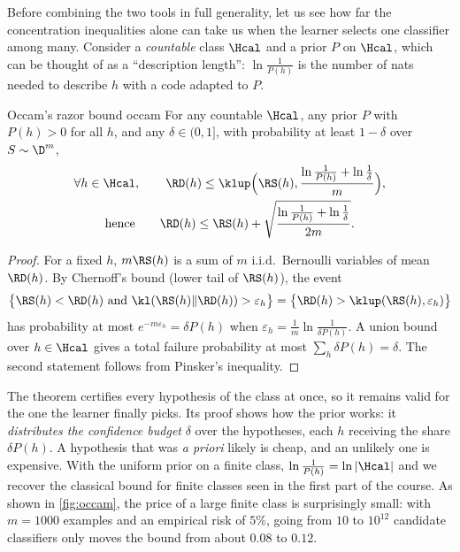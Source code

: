 Before combining the two tools in full generality, let us see how far the
concentration inequalities alone can take us when the learner selects one
classifier among many. Consider a \emph{countable} class $\Hcal$ and a
prior $P$ on $\Hcal$, which can be thought of as a ``description length'':
$\ln\frac1{P(h)}$ is the number of nats needed to describe $h$ with a code
adapted to $P$.

\begin{theorem}{Occam's razor bound \citep{blumer1987occam,langford2005tutorial}}{occam}
For any countable $\Hcal$, any prior $P$ with $P(h)>0$ for all $h$, and any
$\delta\in(0,1]$, with probability at least $1-\delta$ over $S\sim\D^m$,
\begin{gather*}
  \forall h\in\Hcal,\qquad \RD(h)\leq\klup\Big(\RS(h),\frac{\ln\frac{1}{P(h)}+\ln\frac1\delta}{m}\Big),\\
  \text{hence}\qquad \RD(h)\leq\RS(h)+\sqrt{\frac{\ln\frac1{P(h)}+\ln\frac1\delta}{2m}}.
\end{gather*}
\end{theorem}

\begin{proof}
For a fixed $h$, $m\RS(h)$ is a sum of $m$ i.i.d.\ Bernoulli variables of mean
$\RD(h)$. By Chernoff's bound (lower tail of $\RS(h)$), the event
\[
\big\{\RS(h)<\RD(h)\text{ and }\kl(\RS(h)\|\RD(h))>\varepsilon_h\big\}=\big\{\RD(h)>\klup(\RS(h),\varepsilon_h)\big\}
\]
has probability at most $e^{-m\varepsilon_h}=\delta P(h)$ when
$\varepsilon_h=\frac1m\ln\frac{1}{\delta P(h)}$. A union bound over $h\in\Hcal$ gives
a total failure probability at most $\sum_h\delta P(h)=\delta$. The second
statement follows from Pinsker's inequality.
\end{proof}

The theorem certifies every hypothesis of the class at once, so it remains valid
for the one the learner finally picks. Its proof shows how the prior works: it \emph{distributes the confidence budget}
$\delta$ over the hypotheses, each $h$ receiving the share $\delta P(h)$. A
hypothesis that was \emph{a priori} likely is cheap, and an unlikely one is
expensive. With the uniform prior on a finite class, $\ln\frac1{P(h)}=\ln|\Hcal|$
and we recover the classical bound for finite classes seen in the first part of
the course. As shown in \cref{fig:occam}, the price of a large finite class is
surprisingly small: with $m=1000$ examples and an empirical risk of $5\%$,
going from $10$ to $10^{12}$ candidate classifiers only moves the bound from
about $0.08$ to $0.12$.

